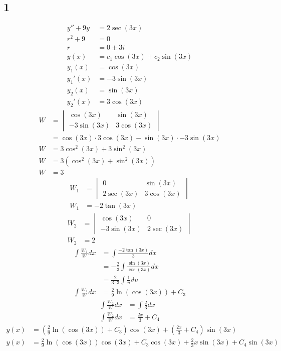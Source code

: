 \documentclass{article}
\begin{document}
\subsection{1}
\begin{align*}
	y'' + 9y & = 2\sec(3x) \\
	r^2 + 9 & = 0 \\
	r & = 0 \pm 3i \\
	y(x) & = c_1\cos(3x) + c_2\sin(3x) \\
	y_1(x) & = \cos(3x) \\
	y_1'(x) & = -3\sin(3x) \\
	y_2(x) & = \sin(3x) \\
	y_2'(x) & = 3\cos(3x)
\end{align*}
\begin{align*}
	W & = 
		\begin{vmatrix}
			\cos(3x) & \sin(3x) \\
			-3\sin(3x) & 3\cos(3x)
		\end{vmatrix} \\
	  & = \cos(3x) \cdot 3\cos(3x) - \sin(3x) \cdot -3\sin(3x) \\
	W & = 3\cos^2(3x) + 3\sin^2(3x) \\
	W & = 3 \left( \cos^2(3x) + \sin^2(3x) \right) \\
	W & = 3
\end{align*}
\begin{align*}
	W_1 & =
		\begin{vmatrix}
			0 & \sin(3x) \\
			2\sec(3x) & 3\cos(3x)
		\end{vmatrix} \\
	W_1 & = -2\tan(3x)
\end{align*}
\begin{align*}
	W_2 & =
		\begin{vmatrix}
			\cos(3x) & 0 \\
			-3\sin(3x) & 2\sec(3x)
		\end{vmatrix} \\
	W_2 & = 2
\end{align*}
\begin{align*}
	\int \frac{W_1}{W} dx & = \int \frac{-2\tan(3x)}{3} dx \\
						  & = -\frac{2}{3} \int \frac{\sin(3x)}{\cos(3x)} dx \\
						  & = \frac{2}{3 \cdot 3} \int \frac{1}{u} du \\
	\int \frac{W_1}{W} dx & = \frac{2}{9} \ln(\cos(3x)) + C_3
\end{align*}
\begin{align*}
	\int \frac{W_2}{W} dx & = \int \frac{2}{3} dx \\
	\int \frac{W_2}{W} dx & = \frac{2x}{3} + C_4
\end{align*}
\begin{align*}
	y(x) & = \left( \frac{2}{9} \ln(\cos(3x)) + C_3 \right) \cos(3x) + \left( \frac{2x}{3} + C_4 \right) \sin(3x) \\
	y(x) & = \frac{2}{9}\ln(\cos(3x))\cos(3x) + C_3\cos(3x) + \frac{2}{3}x\sin(3x) + C_4\sin(3x)
\end{align*}
\end{document}

